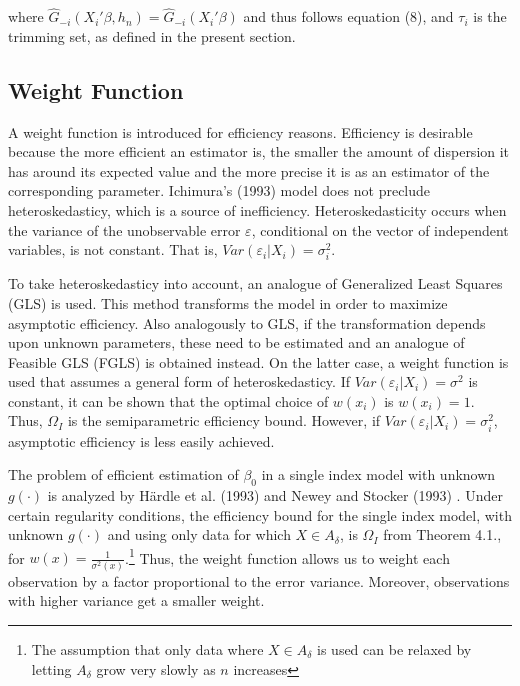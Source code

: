 \documentclass[a4paper]{article}
\begin{document}
where $\hat{G}_{-i}(X_i'\beta, h_n) = \hat{G}_{-i}(X_i'\beta)$ and thus follows equation (8), and $\tau_i$ is the trimming set, as defined in  the present section.

\subsection{Weight Function} %
\label{sub:Weight Function}

A weight function is introduced for efficiency reasons. Efficiency is desirable because the more efficient an estimator is, the smaller the amount of dispersion it has around its expected value and the more precise it is as an estimator of the corresponding parameter. Ichimura's (1993) \cite{[6]} model does not preclude heteroskedasticy, which is a source of inefficiency.  Heteroskedasticity occurs when the variance of the unobservable error $\varepsilon$, conditional on  the vector of independent variables, is not constant. That is, $Var(\varepsilon_i|X_i) = \sigma_i^2$.  

To take heteroskedasticy into account, an analogue of Generalized Least Squares (GLS) is used. This method transforms the model in order to maximize asymptotic efficiency. Also analogously to GLS, if the transformation depends upon unknown parameters, these need to be estimated and an analogue of Feasible GLS (FGLS) is obtained instead. On the latter case, a weight function is used that assumes a general form of heteroskedasticy.
If $Var(\varepsilon_i|X_i) = \sigma^2$ is constant, it can be shown that the optimal choice of $w(x_i)$ is $w(x_i)=1$. Thus, $\Omega_I$ is the semiparametric efficiency bound. However, if $Var(\varepsilon_i|X_i) = \sigma_i^2$, asymptotic efficiency is less easily achieved.  

The problem of efficient estimation of $\beta_0$ in a single index model with unknown $g(\cdot)$ is analyzed by H{\"a}rdle et al. (1993) \cite{[18]} and Newey and Stocker (1993) \cite{[19]}. Under certain regularity conditions, the efficiency bound for the single index model, with unknown $g(\cdot)$ and using only data for which $X \in A_{\delta}$, is $\Omega_I$ from Theorem 4.1., for $w(x) = \frac{1}{\sigma^2(x)}$.\footnote{The assumption that only data where  $X \in A_{\delta}$ is used can be relaxed by letting $A_\delta$ grow very slowly as $n$ increases} Thus, the weight function allows us to weight each observation by a factor proportional to the error variance. Moreover, observations with higher variance get a smaller weight. 
\end{document}
